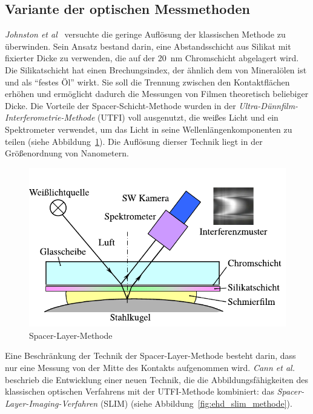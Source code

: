 \subsection{Variante der optischen Messmethoden}
\label{sub:variante_der_optischen_messmethoden}

\textit{Johnston et al}~\cite{johnston_1991} versuchte die geringe Auflösung der klassischen Methode zu überwinden.
Sein Ansatz bestand darin, eine Abstandsschicht aus Silikat mit fixierter Dicke zu verwenden, die auf der \SI{20}{\nm} Chromschicht abgelagert wird.
Die Silikatschicht hat einen Brechungsindex, der ähnlich dem von Mineralölen ist und als ``festes Öl'' wirkt.
Sie soll die Trennung zwischen den Kontaktflächen erhöhen und ermöglicht dadurch die Messungen von Filmen theoretisch beliebiger Dicke.
Die Vorteile der Spacer-Schicht-Methode wurden in der \textit{Ultra-Dünnfilm-Interferometrie-Methode} (UTFI) voll ausgenutzt, die weißes Licht und ein Spektrometer verwendet, um das Licht in seine Wellenlängenkomponenten zu teilen (siehe Abbildung~\ref{fig:ehd_spacer_layer_johnston}).
Die Auflösung dierser Technik liegt in der Größenordnung von Nanometern.

\begin{figure}[htb]
    \centering
    \includegraphics[]{./images/spacer_layer_methode_furtuna.pdf}
    \caption{Spacer-Layer-Methode \cite{johnston_1991}}
    \label{fig:ehd_spacer_layer_johnston}
\end{figure}

Eine Beschränkung der Technik der Spacer-Layer-Methode besteht darin, dass nur eine Messung von der Mitte des Kontakts aufgenommen wird.
\textit{Cann et al.}~\cite{cann_1996} beschrieb die Entwicklung einer neuen Technik, die die Abbildungsfähigkeiten des klassischen optischen Verfahrens mit der UTFI-Methode kombiniert: das \textit{Spacer-Layer-Imaging-Verfahren} (SLIM) (siehe Abbildung~\ref{fig:ehd_slim_methode}).

